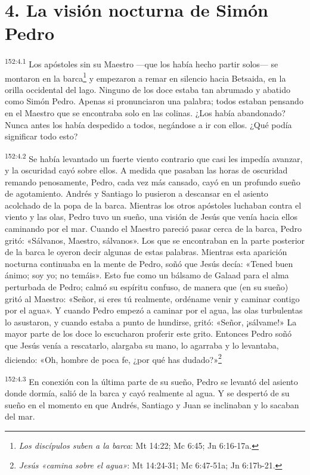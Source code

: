 \section*{4. La visión nocturna de Simón Pedro}
\par 
\textsuperscript{152:4.1} Los apóstoles sin su Maestro ---que los había hecho partir solos--- se montaron en la barca\footnote{\textit{Los discípulos suben a la barca}: Mt 14:22; Mc 6:45; Jn 6:16-17a.} y empezaron a remar en silencio hacia Betsaida, en la orilla occidental del lago. Ninguno de los doce estaba tan abrumado y abatido como Simón Pedro. Apenas si pronunciaron una palabra; todos estaban pensando en el Maestro que se encontraba solo en las colinas. ¿Los había abandonado? Nunca antes los había despedido a todos, negándose a ir con ellos. ¿Qué podía significar todo esto?

\par 
\textsuperscript{152:4.2} Se había levantado un fuerte viento contrario que casi les impedía avanzar, y la oscuridad cayó sobre ellos. A medida que pasaban las horas de oscuridad remando penosamente, Pedro, cada vez más cansado, cayó en un profundo sueño de agotamiento. Andrés y Santiago lo pusieron a descansar en el asiento acolchado de la popa de la barca. Mientras los otros apóstoles luchaban contra el viento y las olas, Pedro tuvo un sueño, una visión de Jesús que venía hacia ellos caminando por el mar. Cuando el Maestro pareció pasar cerca de la barca, Pedro gritó: «Sálvanos, Maestro, sálvanos». Los que se encontraban en la parte posterior de la barca le oyeron decir algunas de estas palabras. Mientras esta aparición nocturna continuaba en la mente de Pedro, soñó que Jesús decía: «Tened buen ánimo; soy yo; no temáis». Esto fue como un bálsamo de Galaad para el alma perturbada de Pedro; calmó su espíritu confuso, de manera que (en su sueño) gritó al Maestro: «Señor, si eres tú realmente, ordéname venir y caminar contigo por el agua». Y cuando Pedro empezó a caminar por el agua, las olas turbulentas lo asustaron, y cuando estaba a punto de hundirse, gritó: «Señor, ¡sálvame!» La mayor parte de los doce lo escucharon proferir este grito. Entonces Pedro soñó que Jesús venía a rescatarlo, alargaba su mano, lo agarraba y lo levantaba, diciendo: «Oh, hombre de poca fe, ¿por qué has dudado?»\footnote{\textit{Jesús «camina sobre el agua»}: Mt 14:24-31; Mc 6:47-51a; Jn 6:17b-21.}

\par 
\textsuperscript{152:4.3} En conexión con la última parte de su sueño, Pedro se levantó del asiento donde dormía, salió de la barca y cayó realmente al agua. Y se despertó de su sueño en el momento en que Andrés, Santiago y Juan se inclinaban y lo sacaban del mar.

